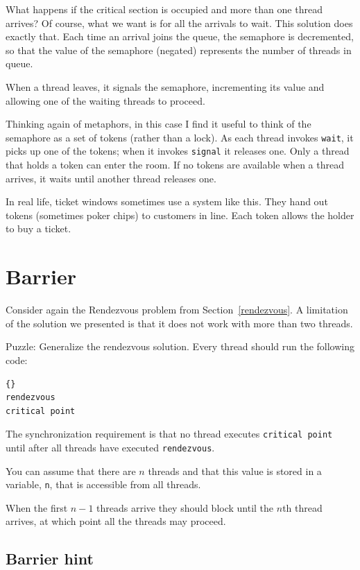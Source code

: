 \documentclass{book}
\newcommand{\clearemptydoublepage}{\newpage\cleardoublepage}
\begin{document}
What happens if the critical section is occupied and more than one
thread arrives?  Of course, what we want is for all the arrivals to
wait.  This solution does exactly that.  Each time an arrival joins
the queue, the semaphore is decremented, so that the value of the
semaphore (negated) represents the number of threads in queue.

When a thread leaves, it signals the semaphore, incrementing
its value and allowing one of the waiting threads to proceed.

Thinking again of metaphors, in this case I find it useful
to think of the semaphore as a set of tokens (rather than
a lock).
As each thread invokes {\tt wait}, it picks up one of
the tokens; when it invokes {\tt signal} it releases one.
Only a thread that holds a token can enter the room.  If no
tokens are available when a thread arrives, it waits until
another thread releases one.

In real life, ticket windows sometimes use a system like
this.  They hand out tokens (sometimes poker chips) to
customers in line.  Each token allows the holder to buy a ticket.




\section{Barrier}

Consider again the Rendezvous problem from Section~\ref{rendezvous}.
A limitation of the solution we presented is that it does
not work with more than two threads.

Puzzle: Generalize the rendezvous solution.  Every thread should
run the following code:

\begin{lstlisting}[title={Barrier code}]{}
rendezvous
critical point
\end{lstlisting}

The synchronization requirement is that
no thread executes {\tt critical point} until after all
threads have executed {\tt rendezvous}.

You can assume that there are $n$
threads and that this value is stored in a variable, {\tt n},
that is accessible from all threads.

When the first $n-1$ threads arrive they should block until the $n$th
thread arrives, at which point all the threads may proceed.


\clearemptydoublepage
\subsection {Barrier hint}
\end{document}
